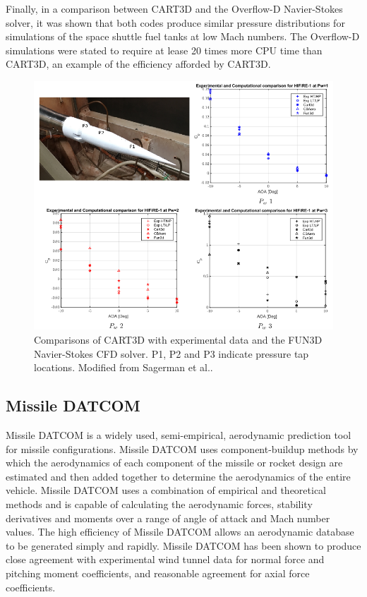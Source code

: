 Finally, in a comparison between CART3D and the Overflow-D Navier-Stokes solver, it was shown that both codes produce similar pressure distributions for simulations of the space shuttle fuel tanks at low Mach numbers\cite{Gomez2004}. The Overflow-D simulations were stated to require at lease 20 times more CPU time than CART3D\cite{Gomez2004}, an example of the efficiency afforded by CART3D.
\begin{figure}[ht]
\centering
\includegraphics[width=0.9\linewidth]{"figures/2_literature-review/CART3D Comparisons"}
\caption{Comparisons of CART3D with experimental data and the FUN3D Navier-Stokes CFD solver. P1, P2 and P3 indicate pressure tap locations. Modified from Sagerman et al.\cite{Sagerman2017}.}
\label{fig:CART3DComparisons}
\end{figure}


\subsection{Missile DATCOM}
Missile DATCOM is a widely used, semi-empirical, aerodynamic prediction tool for missile configurations. Missile DATCOM uses component-buildup methods by which the aerodynamics of each component of the missile or rocket design are estimated and then added together to determine the aerodynamics of the entire vehicle. Missile DATCOM uses a combination of empirical and theoretical methods and is capable of calculating the aerodynamic forces, stability derivatives and moments over a range of angle of attack and Mach number values. The high efficiency of Missile DATCOM allows an aerodynamic database to be generated simply and rapidly. Missile DATCOM has been shown to produce close agreement with experimental wind tunnel data for normal force and pitching moment coefficients, and reasonable agreement for axial force coefficients\cite{Sooy2005}. 


      
      
      
      
